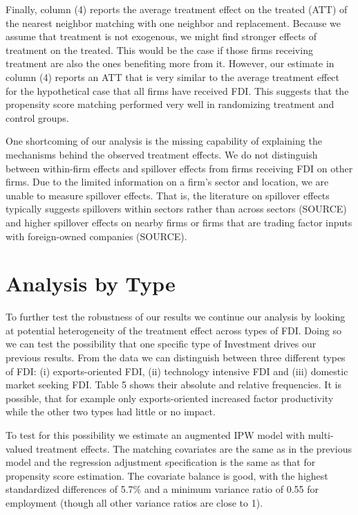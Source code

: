 \documentclass[a4paper,11pt]{scrartcl}
\begin{document}
Finally, column (4) reports the average treatment effect on the treated (ATT) of the nearest neighbor matching with one neighbor and replacement. Because we assume that treatment is not exogenous, we might find stronger effects of treatment on the treated. This would be the case if those firms receiving treatment are also the ones benefiting more from it. However, our estimate in column (4) reports an ATT that is very similar to the average treatment effect for the hypothetical case that all firms have received FDI. This suggests that the propensity score matching performed very well in randomizing treatment and control groups. 

One shortcoming of our analysis is the missing capability of explaining the mechanisms behind the observed treatment effects. We do not distinguish between within-firm effects and spillover effects from firms receiving FDI on other firms. Due to the limited information on a firm's sector and location, we are unable to measure spillover effects. That is, the literature on spillover effects typically suggests spillovers within sectors rather than across sectors (SOURCE) and higher spillover effects on nearby firms or firms that are trading factor inputs with foreign-owned companies (SOURCE). 




\section{Analysis by Type}


To further test the robustness of our results  we continue our analysis by looking at potential heterogeneity of the treatment effect across types of FDI. Doing so we can test the possibility that one specific type of Investment drives our previous results. From the data we can distinguish between three different types of FDI: (i) exports-oriented FDI, (ii) technology intensive FDI and (iii) domestic market seeking FDI. Table 5 shows their absolute and relative frequencies. It is possible, that for example only exports-oriented increased factor productivity while the other two types had little or no impact.





To test for this possibility we estimate an augmented IPW model with multi-valued treatment effects. The matching covariates are the same as in the previous model and the regression adjustment specification is the same as that for propensity score estimation. The covariate balance is good, with the highest standardized differences of 5.7\% and a minimum variance ratio of 0.55 for employment (though all other variance ratios are close to 1).
\end{document}
